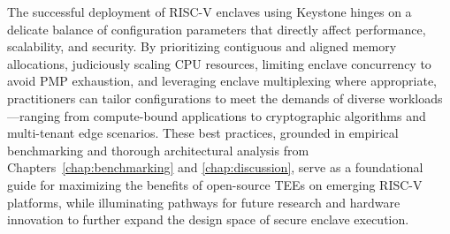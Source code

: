 The successful deployment of RISC-V enclaves using Keystone hinges on a delicate balance of configuration parameters that directly affect performance, scalability, and security. By prioritizing contiguous and aligned memory allocations, judiciously scaling CPU resources, limiting enclave concurrency to avoid PMP exhaustion, and leveraging enclave multiplexing where appropriate, practitioners can tailor configurations to meet the demands of diverse workloads—ranging from compute-bound applications to cryptographic algorithms and multi-tenant edge scenarios. These best practices, grounded in empirical benchmarking and thorough architectural analysis from Chapters~\ref{chap:benchmarking} and \ref{chap:discussion}, serve as a foundational guide for maximizing the benefits of open-source TEEs on emerging RISC-V platforms, while illuminating pathways for future research and hardware innovation to further expand the design space of secure enclave execution.
